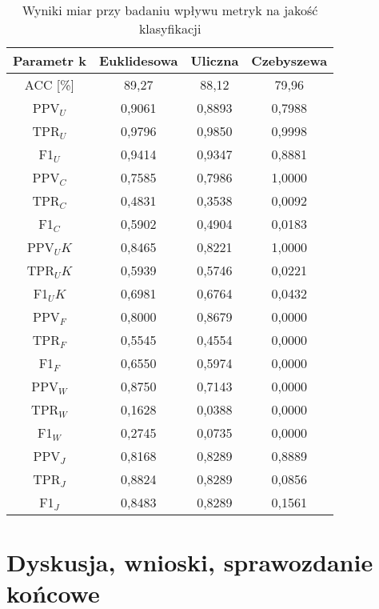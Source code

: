 \documentclass{article}
\begin{document}
\begin{table}[h!]
    \centering
    \begin{tabular}{|c|c|c|c|}
    \hline
    \textbf{Parametr k} & \textbf{Euklidesowa} & \textbf{Uliczna} & \textbf{Czebyszewa}  \\ \hline
    ACC [\%] & 89,27 & 88,12 & 79,96\\ \hline
    PPV\(_U\) & 0,9061 & 0,8893 & 0,7988\\ \hline
    TPR\(_U\) & 0,9796& 0,9850 & 0,9998\\ \hline
    F1\(_U\)  & 0,9414& 0,9347 & 0,8881\\ \hline
    PPV\(_C\) & 0,7585& 0,7986 & 1,0000\\ \hline
    TPR\(_C\) &  0,4831& 0,3538 & 0,0092\\ \hline
    F1\(_C\) & 0,5902& 0,4904 & 0,0183\\ \hline
    PPV\(_UK\) & 0,8465& 0,8221 & 1,0000\\ \hline
    TPR\(_UK\) & 0,5939& 0,5746 & 0,0221\\ \hline
    F1\(_UK\) & 0,6981& 0,6764 & 0,0432\\ \hline
    PPV\(_F\) & 0,8000& 0,8679 & 0,0000\\ \hline
    TPR\(_F\) & 0,5545& 0,4554 & 0,0000\\ \hline
    F1\(_F\) & 0,6550& 0,5974 & 0,0000\\ \hline
    PPV\(_W\) & 0,8750& 0,7143 & 0,0000\\ \hline
    TPR\(_W\) & 0,1628& 0,0388 & 0,0000\\ \hline
    F1\(_W\) & 0,2745& 0,0735 & 0,0000\\ \hline
    PPV\(_J\) & 0,8168& 0,8289 & 0,8889\\ \hline
    TPR\(_J\) & 0,8824& 0,8289 & 0,0856\\ \hline
    F1\(_J\) & 0,8483 & 0,8289 & 0,1561\\ \hline
    \end{tabular}
    \caption{Wyniki miar przy badaniu wpływu metryk na jakość klasyfikacji}
\end{table}


\section{Dyskusja, wnioski, sprawozdanie końcowe}
\end{document}
